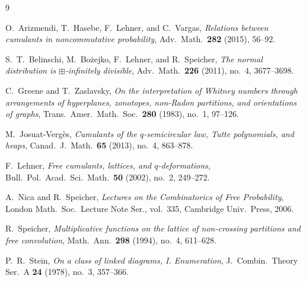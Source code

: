 \documentclass[11pt,a4paper]{article}
\theoremstyle{definition}
\theoremstyle{remark}
\begin{document}
\begin{thebibliography}{9}\small\setlength{\itemsep}{2pt}

O.~Arizmendi, T.~Hasebe, F.~Lehner, and C.~Vargas,
\emph{Relations between cumulants in noncommutative probability},
Adv.\ Math.\ \textbf{282} (2015), 56--92.

S.~T.~Belinschi, M.~Bo\.zejko, F.~Lehner, and R.~Speicher,
\emph{The normal distribution is $\boxplus$-infinitely divisible},
Adv.\ Math.\ \textbf{226} (2011), no.~4, 3677--3698.

C.~Greene and T.~Zaslavsky,
\emph{On the interpretation of Whitney numbers through arrangements of hyperplanes, zonotopes, non-Radon partitions, and orientations of graphs},
Trans.\ Amer.\ Math.\ Soc.\ \textbf{280} (1983), no.~1, 97--126.

M.~Josuat-Verg\`es,
\emph{Cumulants of the $q$-semicircular law, Tutte polynomials, and heaps},
Canad.\ J.\ Math.\ \textbf{65} (2013), no.~4, 863--878.

F.~Lehner,
\emph{Free cumulants, lattices, and $q$-deformations},
Bull.\ Pol.\ Acad.\ Sci.\ Math.\ \textbf{50} (2002), no.~2, 249--272.

A.~Nica and R.~Speicher,
\emph{Lectures on the Combinatorics of Free Probability},
London Math.\ Soc.\ Lecture Note Ser., vol.~335, Cambridge Univ.\ Press, 2006.

R.~Speicher,
\emph{Multiplicative functions on the lattice of non-crossing partitions and free convolution},
Math.\ Ann.\ \textbf{298} (1994), no.~4, 611--628.

P.~R.~Stein,
\emph{On a class of linked diagrams, I. Enumeration},
J.\ Combin.\ Theory Ser.\ A \textbf{24} (1978), no.~3, 357--366.

\end{thebibliography}
\end{document}
